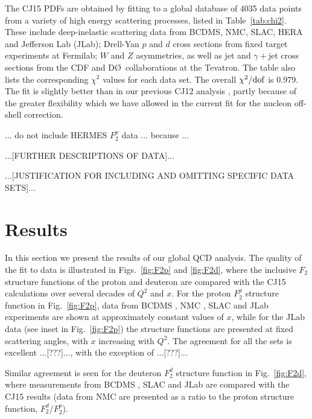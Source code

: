\documentclass[aps,prd,amsmath,preprint]{revtex4}
\begin{document}
The CJ15 PDFs are obtained by fitting to a global database of 4035
data points from a variety of high energy scattering processes,
listed in Table~\ref{tab:chi2}.
These include
  deep-inelastic scattering data from BCDMS, NMC, SLAC, HERA and
Jefferson Lab (JLab);
  Drell-Yan $p$ and $d$ cross sections from fixed target experiments
at Fermilab;
  $W$ and $Z$ asymmetries, as well as jet and $\gamma+$jet cross
sections from the CDF and D\O\ collaborations at the Tevatron.
%
The table also lists the corresponding $\chi^2$ values for each
data set.  The overall $\chi^2/{\rm dof}$ is 0.979.
The fit is slightly better than in our previous CJ12 analysis
\cite{CJ12}, partly because of the greater flexibility which
we have allowed in the current fit for the nucleon off-shell
correction.


... do not include HERMES $F_2^p$ data ... because ...


{\color{red} ...[FURTHER DESCRIPTIONS OF DATA]...

...[JUSTIFICATION FOR INCLUDING AND OMITTING SPECIFIC DATA SETS]...}


\section{Results}
\label{sec:results}

In this section we present the results of our global QCD analysis.
The quality of the fit to data is illustrated in Figs.~\ref{fig:F2p}
and \ref{fig:F2d}, where the inclusive $F_2$ structure functions
of the proton and deuteron are compared with the CJ15 calculations
over several decades of $Q^2$ and $x$.
%
%
For the proton $F_2^p$ structure function in Fig.~\ref{fig:F2p},
data from BCDMS \cite{BCDMS}, NMC \cite{NMCp}, SLAC \cite{SLAC}
and JLab \cite{Malace} experiments are shown at approximately
constant values of $x$, while for the JLab data (see inset in
Fig.~\ref{fig:F2p}) the structure functions are presented at fixed
scattering angles, with $x$ increasing with $Q^2$.
The agreement for all the sets is excellent ...[???]...,
with the exception of ...[???]...


Similar agreement is seen for the deuteron $F_2^d$ structure function
in Fig.~\ref{fig:F2d}, where measurements from BCDMS \cite{BCDMS},
SLAC \cite{SLAC} and JLab \cite{Malace} are compared with the CJ15
results (data from NMC are presented as a ratio to the proton
structure function, $F_2^d/F_2^p$).
\end{document}
